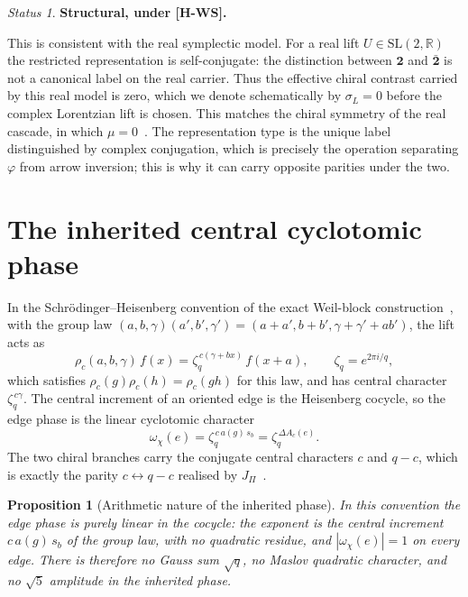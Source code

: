 \documentclass[11pt]{article}
\theoremstyle{plain}
\newtheorem{proposition}{Proposition}
\theoremstyle{remark}
\newtheorem*{status}{Status}
\newcommand{\zq}{\zeta_q}
\newcommand{\dac}{\Delta A_c}
\newcommand{\JPi}{J_\Pi}
\newcommand{\two}{\mathbf{2}}
\newcommand{\twobar}{\bar{\mathbf{2}}}
\begin{document}
    \begin{status}\textbf{Structural, under [H-WS].}\end{status}

    This is consistent with the real symplectic model.
    For a real lift $U\in\mathrm{SL}(2,\mathbb{R})$ the restricted representation is self-conjugate: the distinction
    between $\two$ and $\twobar$ is not a canonical label on the real carrier.
    Thus the effective chiral contrast carried by this real model is zero, which we denote schematically by $\sigma_L = 0$
    before the complex Lorentzian lift is chosen.
    This matches the chiral symmetry of the real cascade, in which $\mu = 0$~\cite[Rem.~6.4]{Beau2026q14}.
    The representation type is the unique label distinguished by complex conjugation, which is precisely the operation
    separating $\varphi$ from arrow inversion; this is why it can carry opposite parities under the two.

  \section{The inherited central cyclotomic phase}

    In the Schr\"odinger--Heisenberg convention of the exact Weil-block construction~\cite{Beau2026a16}, with the group law
    $(a,b,\gamma)(a',b',\gamma')=(a+a',b+b',\gamma+\gamma'+ab')$, the lift acts as
    \begin{equation}
      \rho_c(a,b,\gamma)\,f(x) = \zq^{\,c(\gamma + bx)}\,f(x+a),
      \qquad \zq = e^{2\pi i/q},
    \end{equation}
    which satisfies $\rho_c(g)\rho_c(h)=\rho_c(gh)$ for this law,
    and has central character $\zq^{\,c\gamma}$.
    The central increment of an oriented edge is the Heisenberg cocycle, so the edge phase is the linear cyclotomic
    character
    \begin{equation}
      \omega_\chi(e) = \zq^{\,c\,a(g)\,s_b} = \zq^{\,\dac(e)}.
    \end{equation}
    The two chiral branches carry the conjugate central characters $c$ and $q-c$, which is exactly the parity
    $c\leftrightarrow q-c$ realised by $\JPi$~\cite[\S 6]{Beau2026q14}.

    \begin{proposition}[Arithmetic nature of the inherited phase]
In this convention the edge phase is purely linear in the cocycle: the exponent is the central increment $c\,a(g)\,s_b$ of the group law, with
no quadratic residue, and $|\omega_\chi(e)| = 1$ on every edge.
There is therefore no Gauss sum $\sqrt{q}$, no Maslov quadratic character, and no $\sqrt{5}$ amplitude in the
inherited phase.
    \end{proposition}
\end{document}
